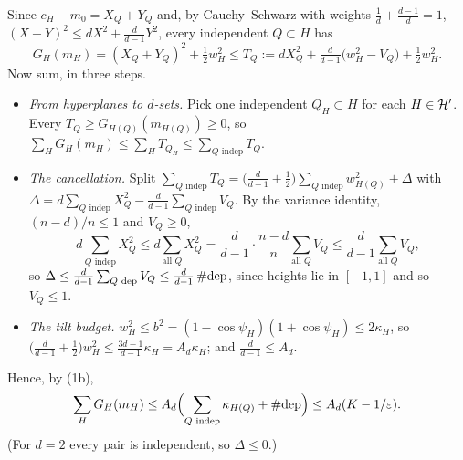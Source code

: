 Since $c_H - m_0 = X_Q + Y_Q$ and, by Cauchy--Schwarz with weights $\frac1d + \frac{d-1}d = 1$,
$(X + Y)^2 \le d X^2 + \frac{d}{d-1} Y^2$, every independent $Q \subset H$ has
\begin{equation*}
  G_H(m_H) = (X_Q + Y_Q)^2 + \tfrac12 w_H^2 \le T_Q := d X_Q^2 + \tfrac{d}{d-1}\bigl(w_H^2 - V_Q\bigr)
    + \tfrac12 w_H^2 .
\end{equation*}
Now sum, in three steps.
\begin{itemize}
  \item \emph{From hyperplanes to $d$-sets.} Pick one independent $Q_H \subset H$ for each
    $H \in \mathcal{H}'$. Every $T_Q \ge G_{H(Q)}(m_{H(Q)}) \ge 0$, so
    $\sum_H G_H(m_H) \le \sum_H T_{Q_H} \le \sum_{Q \text{ indep}} T_Q$.
  \item \emph{The cancellation.} Split
    $\sum_{Q \text{ indep}} T_Q = \bigl(\frac{d}{d-1} + \frac12\bigr) \sum_{Q \text{ indep}} w_{H(Q)}^2
    + \Delta$ with $\Delta = d \sum_{Q \text{ indep}} X_Q^2 - \frac{d}{d-1} \sum_{Q \text{ indep}} V_Q$.
    By the variance identity, $(n - d)/n \le 1$ and $V_Q \ge 0$,
    \begin{equation*}
      d \sum_{Q \text{ indep}} X_Q^2 \le d \sum_{\text{all } Q} X_Q^2
        = \frac{d}{d-1}\cdot\frac{n-d}{n} \sum_{\text{all } Q} V_Q \le \frac{d}{d-1} \sum_{\text{all } Q} V_Q ,
    \end{equation*}
    so $\Delta \le \frac{d}{d-1} \sum_{Q \text{ dep}} V_Q \le \frac{d}{d-1}\,\#\mathrm{dep}$, since heights lie in
    $[-1, 1]$ and so $V_Q \le 1$.
  \item \emph{The tilt budget.} $w_H^2 \le b^2 = (1 - \cos\psi_H)(1 + \cos\psi_H) \le 2\kappa_H$, so
    $\bigl(\frac{d}{d-1} + \frac12\bigr) w_H^2 \le \frac{3d-1}{d-1}\kappa_H = A_d \kappa_H$; and
    $\frac{d}{d-1} \le A_d$.
\end{itemize}
Hence, by (1b),
\begin{equation*}
  \sum_H G_H(m_H) \le A_d \Bigl(\sum_{Q \text{ indep}} \kappa_{H(Q)} + \#\mathrm{dep}\Bigr) \le A_d (K - 1/\varepsilon).
\end{equation*}
(For $d = 2$ every pair is independent, so $\Delta \le 0$.)

